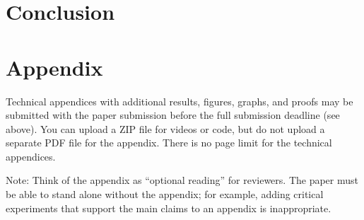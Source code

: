 \documentclass{article}
\begin{document}
\section{Conclusion}






\appendix

\section{Appendix}
Technical appendices with additional results, figures, graphs, and proofs may be submitted with the paper submission before the full submission deadline (see above). You can upload a ZIP file for videos or code, but do not upload a separate PDF file for the appendix. There is no page limit for the technical appendices. 

Note: Think of the appendix as ``optional reading'' for reviewers. The paper must be able to stand alone without the appendix; for example, adding critical experiments that support the main claims to an appendix is inappropriate. 


\newpage
\end{document}
